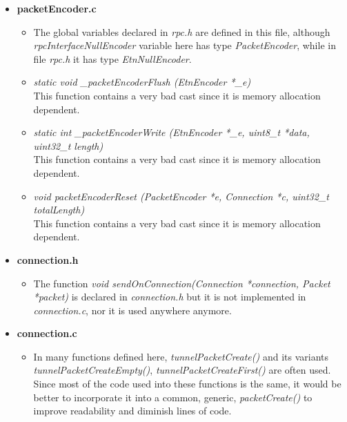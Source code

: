 \begin{itemize}
\item \textbf{packetEncoder.c}
\begin{itemize}
\item The global variables declared in \emph{rpc.h} are defined in this file, although \emph{rpcInterfaceNullEncoder} variable here has type \emph{PacketEncoder}, while in file \emph{rpc.h} it has type \emph{EtnNullEncoder}.

\item \emph{static void \_packetEncoderFlush (EtnEncoder *\_e)}\\
This function contains a very bad cast since it is memory allocation dependent.

\item \emph{static int \_packetEncoderWrite (EtnEncoder *\_e, uint8\_t *data, uint32\_t length)}\\
This function contains a very bad cast since it is memory allocation dependent.
\item \emph{void packetEncoderReset (PacketEncoder *e, Connection *c, uint32\_t totalLength)}\\
This function contains a very bad cast since it is memory allocation dependent.
\end{itemize}

\item \textbf{connection.h}
\begin{itemize}
\item The function \emph{void sendOnConnection(Connection *connection, Packet *packet)} is declared in \emph{connection.h} but it is not implemented in \emph{connection.c}, nor it is used anywhere anymore.
\end{itemize}

\item \textbf{connection.c}
\begin{itemize}
\item In many functions defined here, \emph{tunnelPacketCreate()} and its variants \emph{tunnelPacketCreateEmpty()}, \emph{tunnelPacketCreateFirst()} are often used. Since most of the code used into these functions is the same, it would be better to incorporate it into a common, generic, \emph{packetCreate()} to improve readability and diminish lines of code.
\end{itemize}

\end{itemize}
